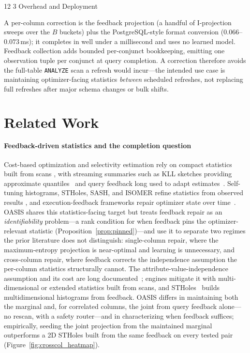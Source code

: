 \documentclass[preprint,12pt]{elsarticle}
\makeatletter
\renewcommand\subsection{\@startsection{subsection}{2}{\z@}%
           {12\p@ \@plus 6\p@ \@minus 3\p@}%
           {3\p@ \@plus 6\p@ \@minus 3\p@}%
           {\normalfont\normalsize\bfseries}}
\makeatother
\begin{document}
\subsection{Overhead and Deployment}
\label{sec:overhead}

A per-column correction is the feedback projection (a handful of I-projection sweeps over the
$B$ buckets) plus the PostgreSQL-style format conversion ($0.066$--$0.073$\,ms); it completes
in well under a millisecond and uses no learned model. Feedback collection adds bounded
per-conjunct bookkeeping, emitting one observation tuple per conjunct at query completion. A
correction therefore avoids the full-table \texttt{ANALYZE} scan a refresh would incur---the intended use case is
maintaining optimizer-facing statistics \emph{between} scheduled refreshes, not
replacing full refreshes after major schema changes or bulk shifts.

\section{Related Work}
\label{sec:related}

\paragraph{Feedback-driven statistics and the completion question}
Cost-based optimization and selectivity estimation rely on compact statistics built
from scans
\cite{selinger1979access,chaudhuri1998overview,ioannidis1993histogram,poosala1997selectivity},
with streaming summaries such as KLL sketches providing approximate
quantiles~\cite{ivkin2019kll} and query feedback long used to adapt
estimates~\cite{chen1994adaptive}. Self-tuning histograms, STHoles, SASH, and ISOMER
refine statistics from observed results
\cite{aboulnaga1999self,bruno2001stholes,lim2003sash,markl2007consistent}, and
execution-feedback frameworks repair optimizer state over
time~\cite{chaudhuri2008paygo}. OASIS shares this statistics-facing target but treats feedback
repair as an \emph{identifiability} problem---a rank condition for when feedback pins the
optimizer-relevant statistic (Proposition~\ref{prop:pinned})---and use it to separate two
regimes the prior literature does not distinguish: single-column repair, where the
maximum-entropy projection is near-optimal and learning is unnecessary, and cross-column
repair, where feedback corrects the independence assumption the per-column statistics
structurally cannot. The attribute-value-independence assumption and its cost are long
documented~\cite{poosala1997selectivity,leis2015good}; engines mitigate it with
multi-dimensional or extended statistics built from scans, and STHoles~\cite{bruno2001stholes}
builds multidimensional histograms from feedback. OASIS differs in maintaining both the
marginal and, for correlated columns, the joint from query feedback alone---no rescan, with a
safety router---and in characterizing when feedback suffices; empirically, seeding the joint
projection from the maintained marginal outperforms a 2D STHoles built from the same feedback
on every tested pair (Figure~\ref{fig:crosscol_heatmap}).
\end{document}
